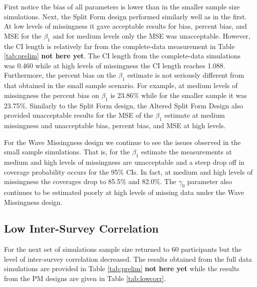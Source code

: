 \documentclass{svjour3}\usepackage[]{graphicx}\usepackage[]{color}
\begin{document}
First notice the bias of all parameters is lower than in the smaller sample size simulations. Next, the Split Form design performed similarly well as in the first. At low levels of missingness it gave acceptable results for bias, percent bias, and MSE for the $\beta_1$ and for medium levels only the MSE was unacceptable. However, the CI length is relatively far from the complete-data measurement in Table \ref{tab:prelim} \textbf{not here yet}. The CI length from the complete-data simulations was 0.460 while at high levels of missingness the CI length reaches 1.088. Furthermore, the percent bias on the $\beta_1$ estimate is not seriously different from that obtained in the small sample scenario. For example, at medium levels of missingness the percent bias on $\beta_1$ is 23.86\% while for the smaller sample it was 23.75\%.
Similarly to the Split Form design, the Altered Split Form Design also provided unacceptable results for the MSE of the $\beta_1$ estimate at medium missingness and unacceptable bias, percent bias, and MSE at high levels.  \par
For the Wave Missingness design we continue to see the issues observed in the small sample simulations. That is, for the $\beta_1$ estimate the measurements at medium and high levels of missingness are unacceptable and a steep drop off in coverage probability occurs for the 95\% CIs. In fact, at medium and high levels of missingness the coverages drop to 85.5\% and 82.0\%. The $\gamma_0$ parameter also continues to be estimated poorly at high levels of missing data under the Wave Missingness design. \par


\subsection{Low Inter-Survey Correlation}
\label{sec:3.3}
For the next set of simulations sample size returned to 60 participants but the level of inter-survey correlation decreased. The results obtained from the full data simulations are provided in Table \ref{tab:prelim} \textbf{not here yet} while the results from the PM designs are given in Table \ref{tab:lowcorr}. \par
\end{document}
